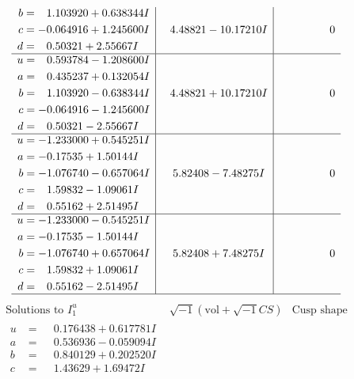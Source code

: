 \documentclass[1p]{elsarticle_modified}
\theoremstyle{definition}
\newcommand{\I}{\sqrt{-1}}
\begin{document}
$$\begin{array}{c|c|c}
\begin{aligned}
b &= \phantom{-}1.103920 + 0.638344 I \\
c &= -0.064916 + 1.245600 I \\
d &= \phantom{-}0.50321 + 2.55667 I\end{aligned}
 & \phantom{-}4.48821 - 10.17210 I & \phantom{-0.000000 } 0 \\ \hline\begin{aligned}
u &= \phantom{-}0.593784 - 1.208600 I \\
a &= \phantom{-}0.435237 + 0.132054 I \\
b &= \phantom{-}1.103920 - 0.638344 I \\
c &= -0.064916 - 1.245600 I \\
d &= \phantom{-}0.50321 - 2.55667 I\end{aligned}
 & \phantom{-}4.48821 + 10.17210 I & \phantom{-0.000000 } 0 \\ \hline\begin{aligned}
u &= -1.233000 + 0.545251 I \\
a &= -0.17535 + 1.50144 I \\
b &= -1.076740 - 0.657064 I \\
c &= \phantom{-}1.59832 - 1.09061 I \\
d &= \phantom{-}0.55162 + 2.51495 I\end{aligned}
 & \phantom{-}5.82408 - 7.48275 I & \phantom{-0.000000 } 0 \\ \hline\begin{aligned}
u &= -1.233000 - 0.545251 I \\
a &= -0.17535 - 1.50144 I \\
b &= -1.076740 + 0.657064 I \\
c &= \phantom{-}1.59832 + 1.09061 I \\
d &= \phantom{-}0.55162 - 2.51495 I\end{aligned}
 & \phantom{-}5.82408 + 7.48275 I & \phantom{-0.000000 } 0\\
 \hline 
 \end{array}$$\newpage$$\begin{array}{c|c|c}  
\text{Solutions to }I^u_{1}& \I (\text{vol} + \sqrt{-1}CS) & \text{Cusp shape}\\
 \hline 
\begin{aligned}
u &= \phantom{-}0.176438 + 0.617781 I \\
a &= \phantom{-}0.536936 - 0.059094 I \\
b &= \phantom{-}0.840129 + 0.202520 I \\
c &= \phantom{-}1.43629 + 1.69472 I \\

\end{aligned}
\end{array}$$
\end{document}
